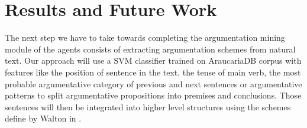 
\section{Results and Future Work}
\label{sec:results}

The next step we have to take towards completing the argumentation mining module of the agents consists of extracting argumentation schemes from natural text. Our approach will use a SVM classifier trained on AraucariaDB corpus with features like the position of sentence in the text, the tense of main verb, the most probable argumentative category of previous and next sentences or argumentative patterns to split argumentative propositions into premises and conclusions. Those sentences will then be integrated into higher level structures using the schemes define by Walton in \cite{walton1996argumentation}.
